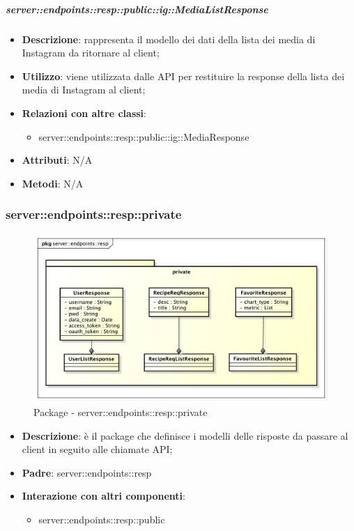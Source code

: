     \subparagraph{server::endpoints::resp::public::ig::MediaListResponse} %
    \label{subp:bdsm_app_server_endpoints_resp_public_ig_medialistresponse}
    \begin{itemize}
      \item \textbf{Descrizione}: rappresenta il modello dei dati della lista dei media di Instagram da ritornare al client;
      \item \textbf{Utilizzo}: viene utilizzata dalle API per restituire la response della lista dei media di Instagram al client;
      \item \textbf{Relazioni con altre classi}:
        \begin{itemize}
          \item server::endpoints::resp::public::ig::MediaResponse
        \end{itemize}
	  \item \textbf{Attributi}: N/A
	  \item \textbf{Metodi}: N/A
      \end{itemize}

\subsubsection{server::endpoints::resp::private} %
\label{ssub:bdsm_app_server_endpoints_resp_private}
\begin{figure}[!htbp]
	\centering
	\centerline{\includegraphics[scale=0.45]{./images/server/resp_private.pdf}}
	\caption{Package - server::endpoints::resp::private}
\end{figure}

\begin{itemize}
  \item \textbf{Descrizione}: è il package che definisce i modelli delle risposte da passare al client in seguito alle chiamate API;
  \item \textbf{Padre}: server::endpoints::resp
  \item \textbf{Interazione con altri componenti}:
  	\begin{itemize}
  		\item server::endpoints::resp::public
	\end{itemize}
\end{itemize}

